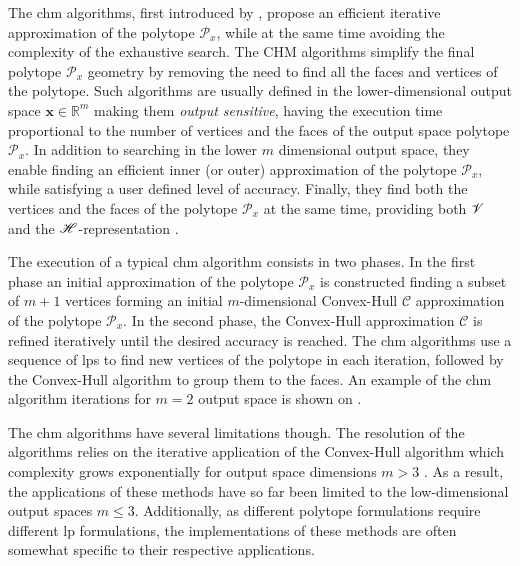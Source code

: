 The \gls{chm} algorithms, first introduced by \citet{lassez1992quantifier, Huynh2005PracticalIO}, propose an efficient iterative approximation of the polytope $\mathcal{P}_x$, while at the same time avoiding the complexity of the exhaustive search. The CHM algorithms simplify the final polytope $\mathcal{P}_x$ geometry by removing the need to find all the faces and vertices of the polytope. Such algorithms are usually defined in the lower-dimensional output space $\bm{x}\in \mathbb{R}^m$ making them \textit{output sensitive}, having the execution time proportional to the number of vertices and the faces of the output space polytope $\mathcal{P}_x$. In addition to searching in the lower $m$ dimensional output space, they enable finding an efficient inner (or outer) approximation of the polytope $\mathcal{P}_x$, while satisfying a user defined level of accuracy. Finally, they find both the vertices and the faces of the polytope $\mathcal{P}_x$ at the same time, providing both $\mathscr{V}$ and the $\mathscr{H}$-representation \cite{Gl_le_2018}.


The execution of a typical \gls{chm} algorithm consists in two phases. In the first phase an initial approximation of the polytope $\mathcal{P}_x$ is constructed finding a subset of $m+1$ vertices forming an initial $m$-dimensional Convex-Hull $\mathcal{C}$ approximation of the polytope $\mathcal{P}_x$. In the second phase, the Convex-Hull approximation $\mathcal{C}$ is refined iteratively until the desired accuracy is reached. The \gls{chm} algorithms use a sequence of \glspl{lp} to find new vertices of the polytope in each iteration, followed by the Convex-Hull algorithm to group them to the faces. An example of the \gls{chm} algorithm iterations for $m=2$ output space is shown on .   

The \gls{chm} algorithms have several limitations though. The resolution of the algorithms relies on the iterative application of the Convex-Hull algorithm which complexity grows exponentially for output space dimensions $m > 3$ \cite{Barber1996}. As a result, the applications of these methods have so far been limited to the low-dimensional output spaces $m\leq3$. Additionally, as different polytope formulations require different \gls{lp} formulations, the implementations of these methods are often somewhat specific to their respective applications. 

